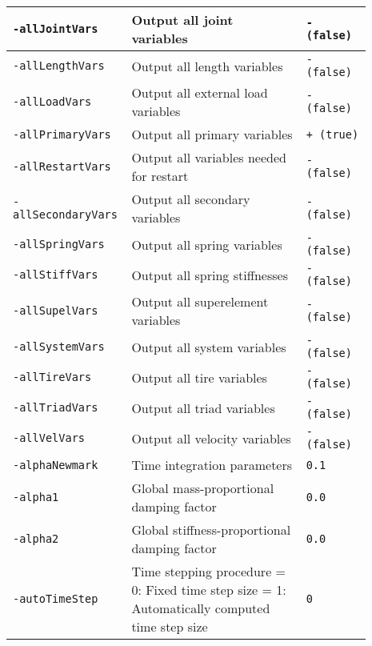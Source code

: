 {\begin{tabular}{|>{\raggedright} p{0.23\linewidth}| p{0.48\linewidth}| p{0.18\linewidth}|}
  \hline
  \texttt{-allJointVars} &   Output all joint variables   &      \texttt{- (false)}  \\
  \hline
  \texttt{-allLengthVars} &   Output all length variables   &      \texttt{- (false)}  \\
  \hline
  \texttt{-allLoadVars} &   Output all external load variables   &      \texttt{- (false)}  \\
  \hline
  \texttt{-allPrimaryVars} &   Output all primary variables   &    \texttt{+ (true)}  \\
  \hline
  \texttt{-allRestartVars} &   Output all variables needed for restart   &       \texttt{- (false)}  \\
  \hline
  \texttt{-allSecondaryVars} &   Output all secondary variables   &       \texttt{- (false)}  \\
  \hline
  \texttt{-allSpringVars} &   Output all spring variables   &       \texttt{- (false)}  \\
  \hline
  \texttt{-allStiffVars} &   Output all spring stiffnesses   &       \texttt{- (false)}  \\
  \hline
  \texttt{-allSupelVars} &   Output all superelement variables   &       \texttt{- (false)}  \\
  \hline
  \texttt{-allSystemVars} &   Output all system variables   &       \texttt{- (false)}  \\
  \hline
  \texttt{-allTireVars} &   Output all tire variables   &       \texttt{- (false)}  \\
  \hline
  \texttt{-allTriadVars} &   Output all triad variables   &       \texttt{- (false)}  \\
  \hline
  \texttt{-allVelVars} &   Output all velocity variables   &       \texttt{- (false)}  \\
  \hline
  \texttt{-alphaNewmark} &   Time integration parameters   &     \texttt{0.1}  \\
  \hline
  \texttt{-alpha1} &   Global mass-proportional damping factor   &     \texttt{0.0}  \\
  \hline
  \texttt{-alpha2} &   Global stiffness-proportional damping factor   &     \texttt{0.0}  \\
  \hline
  \texttt{-autoTimeStep} &   Time stepping procedure\newline
                             = 0: Fixed time step size\newline
                             = 1: Automatically computed time step size   &     \texttt{0}  \\
  \hline

\end{tabular}}

